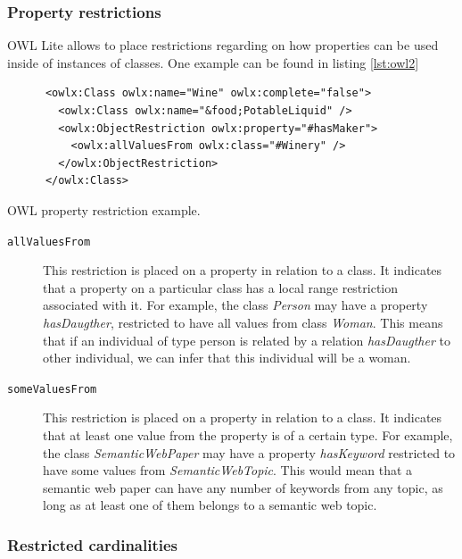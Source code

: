 \subsubsection*{Property restrictions}

OWL Lite allows to place restrictions regarding on how properties can be used inside of instances of classes. One example can be found in listing \ref{lst:owl2}

\begin{listing}[ht]\centering
  \begin{minipage}{.8\textwidth}
    \begin{verbatim}
      <owlx:Class owlx:name="Wine" owlx:complete="false">
        <owlx:Class owlx:name="&food;PotableLiquid" />  
        <owlx:ObjectRestriction owlx:property="#hasMaker"> 
          <owlx:allValuesFrom owlx:class="#Winery" />
        </owlx:ObjectRestriction> 
      </owlx:Class>
    \end{verbatim}
  \end{minipage}
  \caption{OWL property restriction example.}\label{lst:owl2}
\end{listing}


\begin{description}
\item[\texttt{allValuesFrom}] This restriction is placed on a property in relation to a class. It indicates that a property on a particular class has a local range restriction associated with it. For example, the class \textit{Person} may have a property \textit{hasDaugther}, restricted to have all values from class \textit{Woman}. This means that if an individual of type person is related by a relation \textit{hasDaugther} to other individual, we can infer that this individual will be a woman.

\item[\texttt{someValuesFrom}] This restriction is placed on a property in relation to a class. It indicates that at least one value from the property is of a certain type. For example, the class \textit{SemanticWebPaper} may have a property \textit{hasKeyword} restricted to have some values from \textit{SemanticWebTopic}. This would mean that a semantic web paper can have any number of keywords from any topic, as long as at least one of them belongs to a semantic web topic.
\end{description}

\subsubsection*{Restricted cardinalities}

